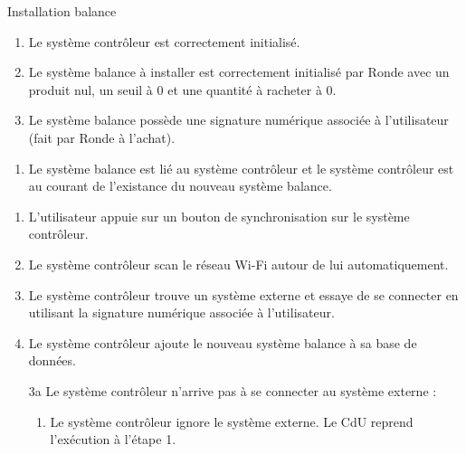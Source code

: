 \begin{UseCase}{Installation balance}

    \begin{UseCasePre}
        \begin{enumerate}
            \item Le système contrôleur est correctement initialisé.
            \item Le système balance à installer est correctement initialisé par
                Ronde avec un produit nul, un seuil à 0 et une quantité à
                racheter à 0.
            \item Le système balance possède une signature numérique associée à
                l'utilisateur (fait par Ronde à l'achat).
        \end{enumerate}
    \end{UseCasePre}

    \begin{UseCasePost}
        \begin{enumerate}
        \item Le système balance est lié au système contrôleur et le système
            contrôleur est au courant de l'existance du nouveau système balance.
        \end{enumerate}
    \end{UseCasePost}

    \begin{UseCaseScenario}
        \begin{enumerate}
        \item L'utilisateur appuie sur un bouton de synchronisation sur le
            système contrôleur.
        \item Le système contrôleur scan le réseau Wi-Fi autour de lui
            automatiquement.
        \item Le système contrôleur trouve un système externe et essaye de se
            connecter en utilisant la signature numérique associée à l'utilisateur.
        \item Le système contrôleur ajoute le nouveau système balance à sa
            base de données.
        \end{enumerate}
    \end{UseCaseScenario}

    \begin{UseCaseExtension}
        \begin{enumerate}
        \item[3a] Le système contrôleur n'arrive pas à se connecter au système externe :
            \begin{enumerate}
                \item Le système contrôleur ignore le système externe. Le CdU reprend
                    l'exécution à l'étape 1.
            \end{enumerate}
        \end{enumerate}
    \end{UseCaseExtension}
\end{UseCase}